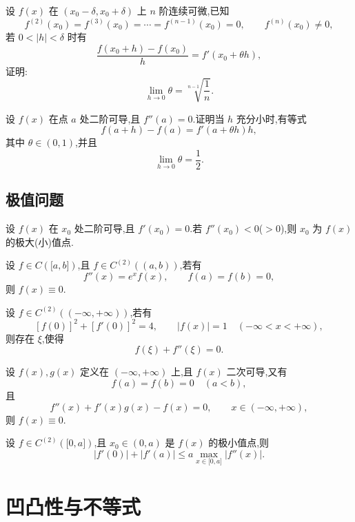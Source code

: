 \documentclass[../数学分析培优讲义.tex]{subfiles}
\begin{document}
\begin{example}
设 $f(x)$ 在 $(x_0-\delta,x_0+\delta)$ 上 $n$ 阶连续可微,已知
\[
    f^{(2)}(x_0)=f^{(3)}(x_0)=\cdots=f^{(n-1)}(x_0)=0,
    \qquad f^{(n)}(x_0)\neq0,
\]
若 $0<|h|<\delta$ 时有
\[
    \dfrac{f(x_0+h)-f(x_0)}{h}=f'(x_0+\theta h),
\]
证明:
\[
    \lim\limits_{h\to0}\theta
    =\sqrt[n-1]{\dfrac{1}{n}}.
\]
\end{example}
\exampleblank

\begin{example}
设 $f(x)$ 在点 $a$ 处二阶可导,且 $f''(a)=0$.证明当 $h$ 充分小时,有等式
\[
    f(a+h)-f(a)=f'(a+\theta h)h,
\]
其中 $\theta\in(0,1)$,并且
\[
    \lim\limits_{h\to0}\theta=\dfrac{1}{2}.
\]
\end{example}
\exampleblank


\newpage

\subsection{极值问题}

设 $f(x)$ 在 $x_0$ 处二阶可导,且 $f'(x_0)=0$.若 $f''(x_0)<0$($>0$),则 $x_0$ 为 $f(x)$ 的极大(小)值点.

\begin{example}
设 $f\in C(\lbrack a,b\rbrack)$,且 $f\in C^{(2)}((a,b))$,若有
\[
    f''(x)=e^x f(x),\qquad f(a)=f(b)=0,
\]
则 $f(x)\equiv0$.
\end{example}
\exampleblank

\begin{example}
设 $f\in C^{(2)}((-\infty,+\infty))$,若有
\[
    [f(0)]^2+[f'(0)]^2=4,
    \qquad |f(x)|=1\quad(-\infty<x<+\infty),
\]
则存在 $\xi$,使得
\[
    f(\xi)+f''(\xi)=0.
\]
\end{example}
\exampleblank

\begin{example}
设 $f(x),g(x)$ 定义在 $(-\infty,+\infty)$ 上,且 $f(x)$ 二次可导,又有
\[
    f(a)=f(b)=0\quad(a<b),
\]
且
\[
    f''(x)+f'(x)g(x)-f(x)=0,
    \qquad x\in(-\infty,+\infty),
\]
则 $f(x)\equiv0$.
\end{example}
\exampleblank

\begin{example}
设 $f\in C^{(2)}(\lbrack 0,a\rbrack)$,且 $x_0\in(0,a)$ 是 $f(x)$ 的极小值点,则
\[
    |f'(0)|+|f'(a)|
    \leq a\max\limits_{x\in\lbrack 0,a\rbrack}|f''(x)|.
\]
\end{example}
\exampleblank


\newpage

\section{凹凸性与不等式}
\end{document}
